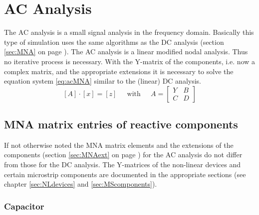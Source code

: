 %
%
%
%

\chapter{AC Analysis}
\label{sec:acMNA}

The AC analysis is a small signal analysis in the frequency domain.
Basically this type of simulation uses the same algorithms as the DC
analysis (section \ref{sec:MNA} on page \pageref{sec:MNA}).  The AC
analysis is a linear modified nodal analysis.  Thus no iterative
process is necessary.  With the Y-matrix of the components, i.e. now a
complex matrix, and the appropriate extensions it is necessary to
solve the equation system \eqref{eq:acMNA} similar to the (linear) DC
analysis.
\begin{equation}
\label{eq:acMNA}
\left[A\right] \cdot \left[x\right] = \left[z\right]
\;\;\;\; \textrm{ with } \;\;\;\;
A =
\begin{bmatrix}
Y & B\\
C & D
\end{bmatrix}
\end{equation}

\section{MNA matrix entries of reactive components}

If not otherwise noted the MNA matrix elements and the extensions of
the components (section \ref{sec:MNAext} on page \pageref{sec:MNAext})
for the AC analysis do not differ from those for the DC analysis.  The
Y-matrices of the non-linear devices and certain microstrip components
are documented in the appropriate sections (see chapter
\ref{sec:NLdevices} and \ref{sec:MScomponents}).

\subsection{Capacitor}

